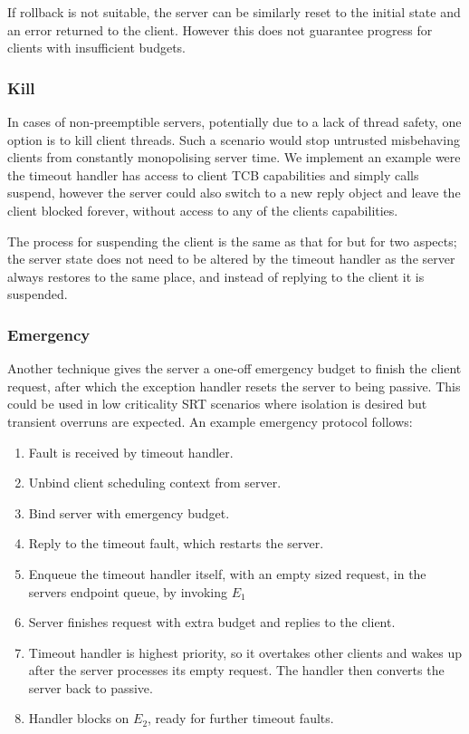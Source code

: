 If rollback is not suitable, the server can be similarly reset to the initial state and an error
returned to the client. However this does not guarantee progress for clients with insufficient
budgets.

\subsubsection{Kill}

In cases of non-preemptible servers, potentially due to a lack of thread safety, one option is to
kill client threads. Such a scenario would stop untrusted misbehaving clients from constantly
monopolising server time.  We implement an example were the timeout handler has access to client \gls{TCB}
capabilities and simply calls suspend, however the server could also switch to a new reply object
and leave the client blocked forever, without access to any of the clients capabilities. 

The process for suspending the client is the same as that for  but for two aspects;
the server state does not need to be altered by the timeout handler as the server always 
restores to the same place, and instead of replying to the client it is suspended.

\subsubsection{Emergency}

Another technique gives the server a one-off emergency budget to finish the client request, after
which the exception handler resets the server to being passive. This could be used in low
criticality \gls{SRT}
scenarios where isolation is desired but transient overruns are expected.
An example emergency protocol follows:

\begin{enumerate}\label{e:emergency}
    \item Fault is received by timeout handler.
    \item Unbind client scheduling context from server.
    \item Bind server with emergency budget.
    \item Reply to the timeout fault, which restarts the server.
    \item Enqueue the timeout handler itself, with an empty sized request, in the servers
          endpoint queue, by invoking $E_{1}$
    \item Server finishes request with extra budget and replies to the client.
    \item Timeout handler is highest priority, so it overtakes other clients and wakes up after the 
          server processes its empty request. The handler then converts the server back to passive.
    \item Handler blocks on $E_{2}$, ready for further timeout faults.
\end{enumerate}

